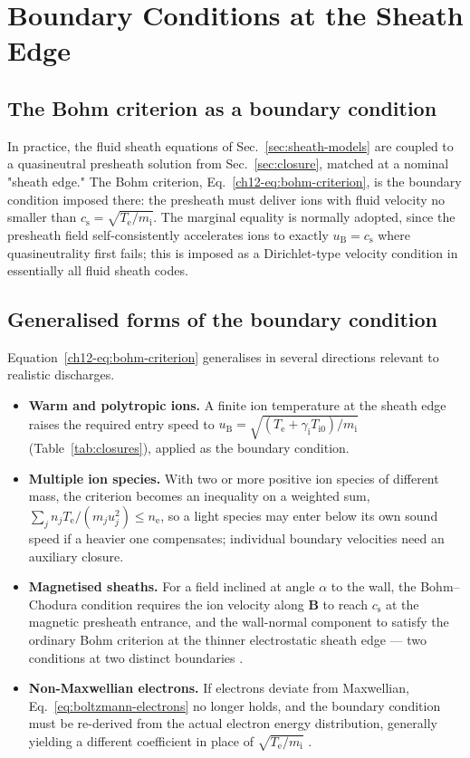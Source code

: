 \section{Boundary Conditions at the Sheath Edge}
\label{sec:bc}

\subsection{The Bohm criterion as a boundary condition}

In practice, the fluid sheath equations of Sec.~\ref{sec:sheath-models} are coupled to a quasineutral presheath solution from Sec.~\ref{sec:closure}, matched at a nominal "sheath edge." The Bohm criterion, Eq.~\eqref{ch12-eq:bohm-criterion}, is the boundary condition imposed there: the presheath must deliver ions with fluid velocity no smaller than $c_{\mathrm{s}}=\sqrt{T_{\mathrm{e}}/m_{\mathrm{i}}}$. The marginal equality is normally adopted, since the presheath field self-consistently accelerates ions to exactly $u_{\mathrm{B}}=c_{\mathrm{s}}$ where quasineutrality first fails; this is imposed as a Dirichlet-type velocity condition in essentially all fluid sheath codes.

\subsection{Generalised forms of the boundary condition}

Equation~\eqref{ch12-eq:bohm-criterion} generalises in several directions relevant to realistic discharges.

\begin{itemize}
\item \textbf{Warm and polytropic ions.} A finite ion temperature at the sheath edge raises the required entry speed to $u_{\mathrm{B}}=\sqrt{(T_{\mathrm{e}}+\gamma_{\mathrm{i}}T_{\mathrm{i}0})/m_{\mathrm{i}}}$ (Table~\ref{tab:closures}), applied as the boundary condition.
\item \textbf{Multiple ion species.} With two or more positive ion species of different mass, the criterion becomes an inequality on a weighted sum, $\sum_j n_{j}T_{\mathrm{e}}/(m_ju_j^2) \le n_{\mathrm{e}}$, so a light species may enter below its own sound speed if a heavier one compensates; individual boundary velocities need an auxiliary closure.
\item \textbf{Magnetised sheaths.} For a field inclined at angle $\alpha$ to the wall, the Bohm--Chodura condition requires the ion velocity along $\mathbf{B}$ to reach $c_{\mathrm{s}}$ at the magnetic presheath entrance, and the wall-normal component to satisfy the ordinary Bohm criterion at the thinner electrostatic sheath edge — two conditions at two distinct boundaries \cite{ref0017,ref0018}.
\item \textbf{Non-Maxwellian electrons.} If electrons deviate from Maxwellian, Eq.~\eqref{eq:boltzmann-electrons} no longer holds, and the boundary condition must be re-derived from the actual electron energy distribution, generally yielding a different coefficient in place of $\sqrt{T_{\mathrm{e}}/m_{\mathrm{i}}}$ \cite{ref0090}.
\end{itemize}

